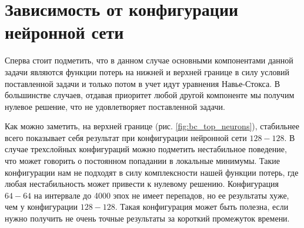 \section{Зависимость от конфигурации нейронной сети}

Сперва стоит подметить, что в данном случае основными компонентами данной задачи
являются функции потерь на нижней и верхней границе в силу условий поставленной
задачи и только потом в учет идут уравнения Навье-Стокса. В большинстве случаев,
отдавая приоритет любой другой компоненте мы получим нулевое решение, что не
удовлетворяет поставленной задачи.

Как можно заметить, на верхней границе (рис. \ref{fig:bc_top_neurons}), стабильнее
всего показывает себя результат при конфигурации нейронной сети $128-128$. В
случае трехслойных конфигураций можно подметить нестабильное поведение, что
может говорить о постоянном попадании в локальные минимумы. Такие конфигурации
нам не подходят в силу комплексности нашей функции потерь, где любая
нестабильность может привести к нулевому решению. Конфигурация $64-64$
на интервале до 4000 эпох не имеет перепадов, но ее результаты хуже,
чем у конфигурации $128-128$. Такая конфигурация может быть полезна, 
если нужно получить не очень точные результаты за короткий промежуток
времени.


